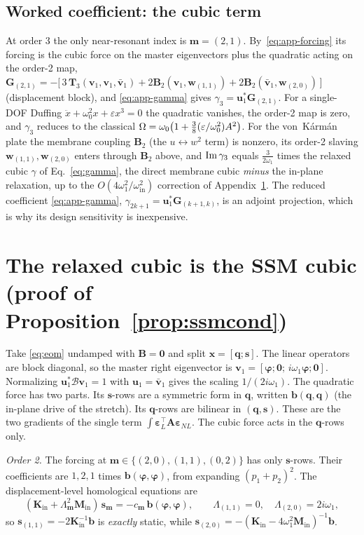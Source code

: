 \subsection{Worked coefficient: the cubic term}
At order 3 the only near-resonant index is $\bm m=(2,1)$. By~\eqref{eq:app-forcing} its
forcing is the cubic force on the master eigenvectors plus the quadratic acting on the
order-2 map, $\bm G_{(2,1)}=-\big[\,3\,\bm T_3(\bm v_1,\bm v_1,\bar{\bm v}_1)
+2\bm B_2(\bm v_1,\bm w_{(1,1)})+2\bm B_2(\bar{\bm v}_1,\bm w_{(2,0)})\,\big]$ (displacement
block), and \eqref{eq:app-gamma} gives $\gamma_3=\bm u_1^{*}\bm G_{(2,1)}$. For a
single-DOF Duffing $\ddot x+\omega_0^2x+\varepsilon x^3=0$ the quadratic vanishes, the
order-2 map is zero, and $\gamma_3$ reduces to the classical
$\Omega=\omega_0\big(1+\tfrac38(\varepsilon/\omega_0^2)A^2\big)$. For the von~K\'arm\'an
plate the membrane coupling $\bm B_2$ (the $u\!\leftrightarrow\!w^2$ term) is nonzero, its
order-2 slaving $\bm w_{(1,1)},\bm w_{(2,0)}$ enters through $\bm B_2$ above, and
$\operatorname{Im}\gamma_3$ equals $\tfrac{3}{2\omega_1}$ times the relaxed cubic $\gamma$ of
Eq.~\eqref{eq:gamma}, the direct membrane cubic \emph{minus} the in-plane relaxation, up to
the $O(4\omega_1^2/\omega_{\mathrm{in}}^2)$ correction of Appendix~\ref{app:ssmcond}. The
reduced coefficient \eqref{eq:app-gamma}, $\gamma_{2k+1}=\bm u_1^{*}\bm G_{(k+1,k)}$, is an
adjoint projection, which is why its design sensitivity is inexpensive.


\section{The relaxed cubic is the SSM cubic (proof of Proposition~\ref{prop:ssmcond})}\label{app:ssmcond}
Take \eqref{eq:eom} undamped with $\bm B=\bm 0$ and split $\bm x=[\bm q;\bm s]$. The linear
operators are block diagonal, so the master right eigenvector is
$\bm v_1=[\bm\varphi;\bm0;\,i\omega_1\bm\varphi;\bm0]$. Normalizing
$\bm u_1^*\bm{\mathcal B}\bm v_1=1$ with $\bm u_1=\bar{\bm v}_1$ gives the scaling
$1/(2i\omega_1)$. The quadratic force has two parts. Its $\bm s$-rows are a symmetric
form in $\bm q$, written $\bm b(\bm q,\bm q)$ (the in-plane drive of the stretch). Its
$\bm q$-rows are bilinear in $(\bm q,\bm s)$. These are the two gradients of the single
term $\int\bm\varepsilon_L^{\!\top}\bm A\bm\varepsilon_{NL}$. The cubic force acts in the
$\bm q$-rows only.

\emph{Order 2.} The forcing at $\bm m\in\{(2,0),(1,1),(0,2)\}$ has only $\bm s$-rows. Their
coefficients are $1,2,1$ times $\bm b(\bm\varphi,\bm\varphi)$, from expanding
$(p_1+p_2)^2$. The displacement-level homological equations are
\begin{equation*}
(\bm K_{\mathrm{in}}+\Lambda_{\bm m}^2\bm M_{\mathrm{in}})\,\bm s_{\bm m}=-c_{\bm m}\,\bm b(\bm\varphi,\bm\varphi),\qquad
\Lambda_{(1,1)}=0,\quad \Lambda_{(2,0)}=2i\omega_1 ,
\end{equation*}
so $\bm s_{(1,1)}=-2\bm K_{\mathrm{in}}^{-1}\bm b$ is \emph{exactly} static, while
$\bm s_{(2,0)}=-(\bm K_{\mathrm{in}}-4\omega_1^2\bm M_{\mathrm{in}})^{-1}\bm b$.

